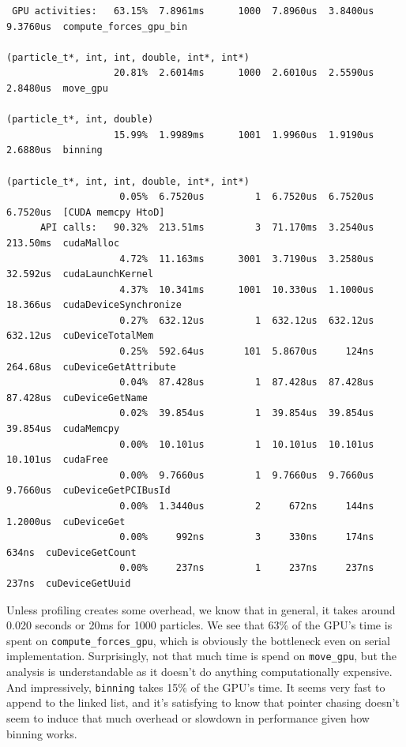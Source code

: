 \documentclass{article}
\begin{document}
\begin{verbatim}
 GPU activities:   63.15%  7.8961ms      1000  7.8960us  3.8400us  9.3760us  compute_forces_gpu_bin
                                                                (particle_t*, int, int, double, int*, int*)
                   20.81%  2.6014ms      1000  2.6010us  2.5590us  2.8480us  move_gpu
                                                                (particle_t*, int, double)
                   15.99%  1.9989ms      1001  1.9960us  1.9190us  2.6880us  binning
                                                                (particle_t*, int, int, double, int*, int*)
                    0.05%  6.7520us         1  6.7520us  6.7520us  6.7520us  [CUDA memcpy HtoD]
      API calls:   90.32%  213.51ms         3  71.170ms  3.2540us  213.50ms  cudaMalloc
                    4.72%  11.163ms      3001  3.7190us  3.2580us  32.592us  cudaLaunchKernel
                    4.37%  10.341ms      1001  10.330us  1.1000us  18.366us  cudaDeviceSynchronize
                    0.27%  632.12us         1  632.12us  632.12us  632.12us  cuDeviceTotalMem
                    0.25%  592.64us       101  5.8670us     124ns  264.68us  cuDeviceGetAttribute
                    0.04%  87.428us         1  87.428us  87.428us  87.428us  cuDeviceGetName
                    0.02%  39.854us         1  39.854us  39.854us  39.854us  cudaMemcpy
                    0.00%  10.101us         1  10.101us  10.101us  10.101us  cudaFree
                    0.00%  9.7660us         1  9.7660us  9.7660us  9.7660us  cuDeviceGetPCIBusId
                    0.00%  1.3440us         2     672ns     144ns  1.2000us  cuDeviceGet
                    0.00%     992ns         3     330ns     174ns     634ns  cuDeviceGetCount
                    0.00%     237ns         1     237ns     237ns     237ns  cuDeviceGetUuid
\end{verbatim}

Unless profiling creates some overhead, we know that in general, it takes around 0.020 seconds or 20ms for 1000 particles. We see that 63\% of the GPU's time is spent on \verb|compute_forces_gpu|, which is obviously the bottleneck even on serial implementation. Surprisingly, not that much time is spend on \verb|move_gpu|, but the analysis is understandable as it doesn't do anything computationally expensive. And impressively, 
\verb|binning| takes 15\% of the GPU's time. It seems very fast to append to the linked list, and it's satisfying to know that pointer chasing doesn't seem to induce that much overhead or slowdown in performance given how binning works.
\end{document}
